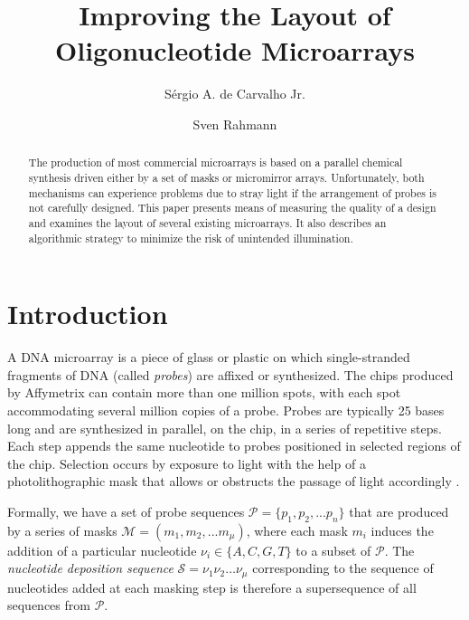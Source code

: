 \documentclass{llncs}
\begin{document}
\thispagestyle{empty}

\title{Improving the Layout of Oligonucleotide Microarrays}
\author{S\'ergio A. de Carvalho Jr. \and Sven Rahmann}

\maketitle

\begin{abstract}
The production of most commercial microarrays is based on a parallel chemical synthesis driven either by a set of masks or micromirror arrays. Unfortunately, both mechanisms can experience problems due to stray light if the arrangement of probes is not carefully designed. This paper presents means of measuring the quality of a design and examines the layout of several existing microarrays. It also describes an algorithmic strategy to minimize the risk of unintended illumination.
\end{abstract}


\section{Introduction}

A DNA microarray is a piece of glass or plastic on which single-stranded fragments of DNA (called \emph{probes}) are affixed or synthesized. The chips produced by Affymetrix can contain more than one million spots, with each spot accommodating several million copies of a probe. Probes are typically 25 bases long and are synthesized in parallel, on the chip, in a series of repetitive steps. Each step appends the same nucleotide to probes positioned in selected regions of the chip. Selection occurs by exposure to light with the help of a photolithographic mask that allows or obstructs the passage of light accordingly \cite{FODOR91}.

Formally, we have a set of probe sequences $\mathcal{P} = \{p_{1}, p_{2}, ... p_{n}\}$ that are produced by a series of masks $\mathcal{M} = (m_{1}, m_{2}, ... m_{\mu})$, where each mask $m_{i}$ induces the addition of a particular nucleotide $\nu_{i} \in \{A, C, G, T\}$ to a subset of $\mathcal{P}$. The \emph{nucleotide deposition sequence} $\mathcal{S} = \nu_{1} \nu_{2} \ldots \nu_{\mu}$ corresponding to the sequence of nucleotides added at each masking step is therefore a supersequence of all sequences from $\mathcal{P}$.
\end{document}
